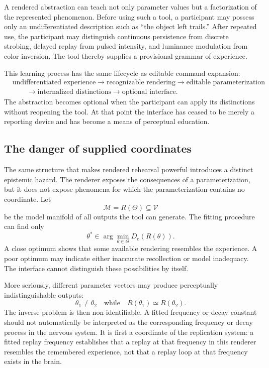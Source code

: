 \documentclass[11pt]{article}
\theoremstyle{remark}
\begin{document}
A rendered abstraction can teach not only parameter values but a factorization of the represented phenomenon. Before using such a tool, a participant may possess only an undifferentiated description such as ``the object left trails.'' After repeated use, the participant may distinguish continuous persistence from discrete strobing, delayed replay from pulsed intensity, and luminance modulation from color inversion. The tool thereby supplies a provisional grammar of experience.

This learning process has the same lifecycle as editable command expansion:
\[
\begin{aligned}
&\text{undifferentiated experience}
\to \text{recognizable rendering}
\to \text{editable parameterization}\\
&\qquad\to \text{internalized distinctions}
\to \text{optional interface}.
\end{aligned}
\]
The abstraction becomes optional when the participant can apply its distinctions without reopening the tool. At that point the interface has ceased to be merely a reporting device and has become a means of perceptual education.

\subsection{The danger of supplied coordinates}

The same structure that makes rendered rehearsal powerful introduces a distinct epistemic hazard. The renderer exposes the consequences of a parameterization, but it does not expose phenomena for which the parameterization contains no coordinate. Let
\[
\mathcal{M}=R(\Theta)\subseteq\mathcal{V}
\]
be the model manifold of all outputs the tool can generate. The fitting procedure can find only
\[
\theta^\ast\in\arg\min_{\theta\in\Theta}D_e(R(\theta)).
\]
A close optimum shows that some available rendering resembles the experience. A poor optimum may indicate either inaccurate recollection or model inadequacy. The interface cannot distinguish these possibilities by itself.

More seriously, different parameter vectors may produce perceptually indistinguishable outputs:
\[
\theta_1\neq\theta_2
\quad\text{while}\quad
R(\theta_1)\simeq R(\theta_2).
\]
The inverse problem is then non-identifiable. A fitted frequency or decay constant should not automatically be interpreted as the corresponding frequency or decay process in the nervous system. It is first a coordinate of the replication system: a fitted replay frequency establishes that a replay at that frequency in this renderer resembles the remembered experience, not that a replay loop at that frequency exists in the brain.
\end{document}
